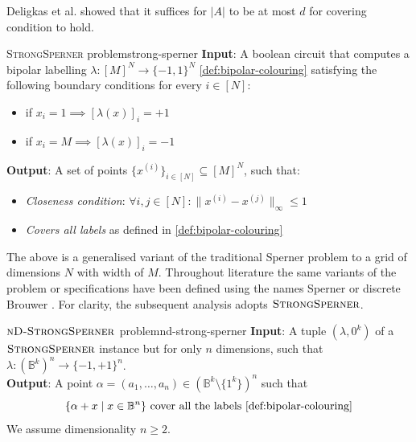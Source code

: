 Deligkas et al. \cite{deligkas_PureCircuitTightInapproximability_2024} showed that
it suffices for $|A|$ to be at most $d$ for covering condition to hold.

\begin{definitionbox}{\textsc{StrongSperner} problem}{strong-sperner}
    \textbf{Input}: A boolean circuit that computes a bipolar labelling $\lambda: [M]^N \to \{-1, 1\}^N$ \ref{def:bipolar-colouring}
    satisfying the following boundary conditions for every $i \in [N]$:
    \begin{itemize}
        \item if $x_i = 1 \implies [\lambda(x)]_i = +1$
        \item if $x_i = M \implies [\lambda(x)]_i = -1$
    \end{itemize}
    \textbf{Output}: A set of points $\{x^{(i)}\}_{i \in [N]} \subseteq [M]^{N}$, such that:
    \begin{itemize}
        \item \textit{Closeness condition}: $\forall i,j \in [N]: \|x^{(i)} - x^{(j)}\|_{\infty} \leq 1$
        \item \textit{Covers all labels} as defined in \ref{def:bipolar-colouring}
    \end{itemize}
\end{definitionbox}

The above is a generalised variant of the traditional Sperner problem to
a grid of dimensions $N$ with width of $M$. 
Throughout literature the same variants of the problem or specifications
have been defined using the names Sperner or discrete Brouwer \cite{chen_SettlingComplexityComputing_2009, chen_Complexity2DDiscrete_2009, daskalakis_ComplexityComputingNash_2006, deligkas_PureCircuitTightInapproximability_2024}.
For clarity, the subsequent analysis adopts $\textsc{StrongSperner}$.

\begin{definitionbox}{$\textnormal{\textsc{nD-StrongSperner}}$ problem}{nd-strong-sperner}
    \textbf{Input}: A tuple $(\lambda,0^k)$ of a $\textnormal{\textsc{StrongSperner}}$ instance but for only $n$ dimensions, such that
    $\lambda : (\mathbb{B}^k)^n \to \{-1, +1\}^n$.\\
    \textbf{Output}: A point $\alpha = (a_1, \hdots, a_n) \in (\mathbb{B}^k \setminus \{1^k\})^n$ such that
    $$
    \{\alpha + x \mid x \in \mathbb{B}^n\} \text{ cover all the labels \ref{def:bipolar-colouring}}
    $$
    We assume dimensionality $n \geq 2$.
\end{definitionbox}

